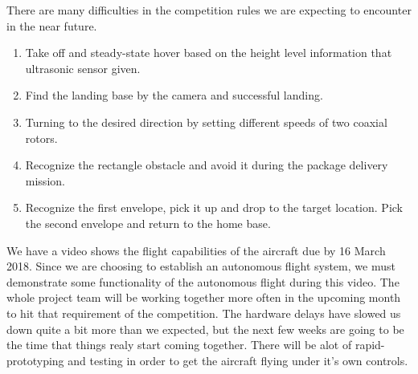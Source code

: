 \documentclass[onecolumn, draftclsnofoot,10pt, compsoc]{IEEEtran}
\begin{document}
There are many difficulties in the competition rules we are expecting to encounter in the near future.  
\begin{enumerate}
\item{Take off and steady-state hover based on the height level information that ultrasonic sensor given.}
\item{Find the landing base by the camera and successful landing.}
\item{Turning to the desired direction by setting different speeds of two coaxial rotors.}
\item{Recognize the rectangle obstacle and avoid it during the package delivery mission.}
\item{Recognize the first envelope, pick it up and drop to the target location. Pick the second envelope and return to the home base.}
\end{enumerate}

We have a video shows the flight capabilities of the aircraft due by 16 March 2018. Since we are choosing to establish an autonomous flight system, we must demonstrate some functionality of the autonomous flight during this video. The whole project team will be working together more often in the upcoming month to hit that requirement of the competition. The hardware delays have slowed us down quite a bit more than we expected, but the next few weeks are going to be the time that things realy start coming together. There will be alot of rapid-prototyping and testing in order to get the aircraft flying under it's own controls. 



\end{document}
